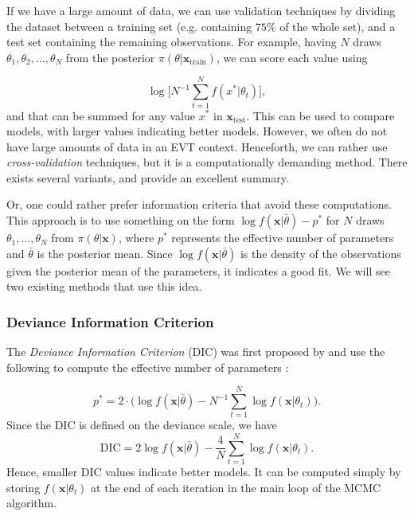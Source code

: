 If we have a large amount of data, we can use validation techniques by dividing the dataset between a training set (e.g. containing $75\%$ of the whole set), and a test set containing the remaining observations.
For example, having $N$ draws $\theta_1,\theta_2,\dots,\theta_N$ from the posterior $\pi(\theta|\boldsymbol{x}_{\text{train}})$, we can score each value using 

\begin{equation*}
\log\bigg[N^{-1}\sum_{t=1}^N f(x^*|\theta_t)\bigg],
\end{equation*}
and that can be summed for any value $x^*$ in $\boldsymbol{x}_{\text{test}}$. This can be used to compare models, with larger values indicating better models.
However, we often do not have large amounts of data in an EVT context. Henceforth, we can rather use \emph{cross-validation} techniques, but it is a computationally demanding method. There exists several variants, and
\citet{Vehtari_practical_2016} provide an excellent summary.

Or, one could rather prefer information criteria that avoid these computations. This approach is to use something on the form $\log f(\boldsymbol{x}|\bar{\theta})-p^*$ for $N$ draws $\theta_1,\dots,\theta_N$ from $\pi(\theta|\boldsymbol{x})$, where $p^*$ represents the effective number of parameters and $\bar{\theta}$ is the posterior mean. Since $\log f(\boldsymbol{x}|\bar{\theta})$ is the density of the observations given the posterior mean of the parameters, it indicates a good fit.  We will see two existing methods that use this idea.

\subsubsection*{Deviance Information Criterion}

The \emph{Deviance Information Criterion}
(DIC) was first proposed by \citet{Spiegelhalter_bayesian_2002} and use the following to compute the effective number of parameters :

\begin{equation*}
p^*=2\cdot \bigg(\log f(\boldsymbol{x}|\bar{\theta})-N^{-1}\sum_{t=1}^N\log f(\boldsymbol{x}|\theta_t)\bigg).
\end{equation*}
Since the DIC is defined on the deviance scale, we have
\begin{equation}
\text{DIC}= 2\log f(\boldsymbol{x}|\bar{\theta}) - \frac{4}{N} \sum_{t=1}^N\log f(\boldsymbol{x}|\theta_t).
\end{equation}
Hence, smaller DIC values indicate better models. It can be computed simply by storing $f(\boldsymbol{x}|\theta_t) $ at the end of each iteration in the main loop of the MCMC algorithm.


